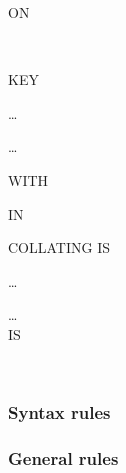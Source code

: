 \begin{syntax}
   \identifier
  \begin{0-1}
    ON
    \begin{1=}
       \\
    \end{1=}
    KEY
    \begin{0-1}
      \identifier
    \end{0-1}\ldots
  \end{0-1} \ldots

  \begin{0-1}
    WITH 
    \begin{0-1}
      IN 
    \end{0-1}
  \end{0-1}

  \begin{0-1}
    COLLATING  IS \identifier
  \end{0-1}

  \begin{0-1}
    \begin{1=}
      \filename
    \end{1=}\ldots
  \end{0-1}

  \begin{0-1}
    \begin{1=}
      \filename
    \end{1=}\ldots \\

      IS
    \procedurename
    \begin{0-1}
      \begin{1=}
         \\
      \end{1=}
      \procedurename
    \end{0-1}
  \end{0-1}
\end{syntax}

\subsubsection{Syntax rules}

\subsubsection{General rules}

